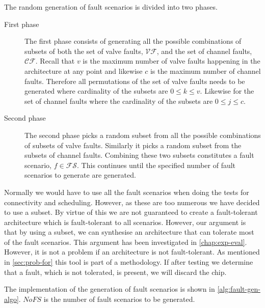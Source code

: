 The random generation of fault scenarios is divided into two phases.\\
\begin{description}
\item[First phase] The first phase consists of generating all the possible combinations of subsets of both the set of valve faults, $\mathcal{VF}$, and the set of channel faults, $\mathcal{CF}$. Recall that $v$ is the maximum number of valve faults happening in the architecture at any point and likewise $c$ is the maximum number of channel faults. Therefore all permutations of the set of valve faults needs to be generated where cardinality of the subsets are $0 \leq k \leq v$. Likewise for the set of channel faults where the cardinality of the subsets are $0 \leq j \leq c$.

\item[Second phase] The second phase picks a random subset from all the possible combinations of subsets of valve faults. Similarly it picks a random subset from the subsets of channel faults. Combining these two subsets constitutes a fault scenario, $f \in \mathcal{FS}$. This continues until the specified number of fault scenarios to generate are generated.

\end{description}

Normally we would have to use all the fault scenarios when doing the tests for connectivity and scheduling. However, as these are too numerous we have decided to use a subset. By virtue of this we are not guaranteed to create a fault-tolerant architecture which is fault-tolerant to all scenarios. However, our argument is that by using a subset, we can synthesise an architecture that can tolerate most of the fault scenarios. This argument has been investigated in \autoref{chap:exp-eval}. However, it is not a problem if an architecture is not fault-tolerant. As mentioned in \autoref{sec:prob-for} this tool is part of a methodology. If after testing we determine that a fault, which is not tolerated, is present, we will discard the chip.

The implementation of the generation of fault scenarios is shown in \autoref{alg:fault-gen-algo}. $NoFS$ is the number of fault scenarios to be generated.

